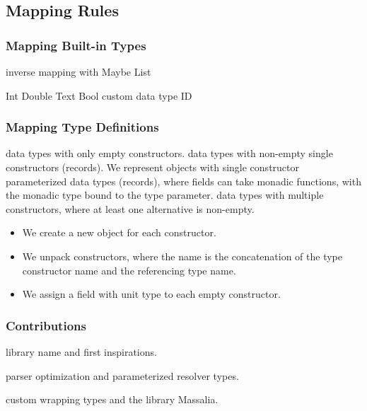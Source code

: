 \subsection{Mapping Rules}

\begin{frame}\frametitle{Mapping Built-in Types}
\begin{itemize}
  \begin{itemize}
     inverse mapping with Maybe
     List
  \end{itemize}
  \begin{itemize}
     Int
     Double
     Text
     Bool
     custom data type ID 
  \end{itemize}
\end{itemize}
\end{frame}

\begin{frame}\frametitle{Mapping Type Definitions}

\begin{itemize}
   data types with only empty constructors.
   data types with non-empty single constructors (records). 
   We represent objects with single constructor parameterized data types (records), where fields can take monadic functions, with the monadic type bound to the type parameter. 
   data types with multiple constructors, where at least one alternative is non-empty.
  \begin{itemize}
    \item We create a new object for each constructor.
    \item We unpack constructors, where the name is the concatenation of the type constructor name and the referencing type name. 
    \item We assign a field with unit type to each empty constructor.
  \end{itemize}
\end{itemize}

\end{frame}

\begin{frame}\frametitle{Contributions}

\begin{itemize} 
  
     library name and first inspirations.

     parser optimization and parameterized resolver types.
    
     custom wrapping types and the library Massalia.

\end{itemize}

\end{frame}